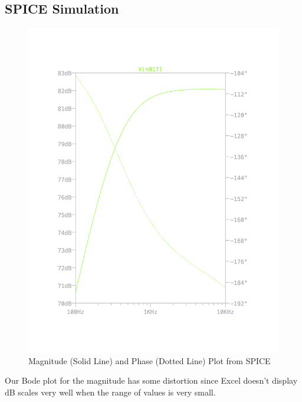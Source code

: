 \documentclass[11pt, twoside, letterpaper]{article}
\begin{document}
\subsection{SPICE Simulation}
\begin{figure}[htbp]
\begin{center}
\includegraphics[width=5in]{MagPlot.png}
\caption{Magnitude (Solid Line) and Phase (Dotted Line) Plot from SPICE}
\end{center}
\end{figure}
\FloatBarrier
\newpage

Our Bode plot for the magnitude has some distortion since Excel doesn't display dB scales very well when the range of values is very small.
\end{document}
